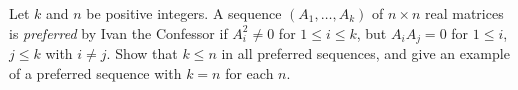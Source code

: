 Let \(k\) and \(n\) be positive integers. A sequence \(\left( A_1, \dots , A_k \right)\) of \(n\times n\) real matrices is \textit{preferred} by Ivan the Confessor if \(A_i^2\neq 0\) for \(1\le i\le k\), but \(A_iA_j=0\) for \(1\le i\), \(j\le k\) with \(i\neq j\). Show that \(k\le n\) in all preferred sequences, and give an example of a preferred sequence with \(k=n\) for each \(n\).